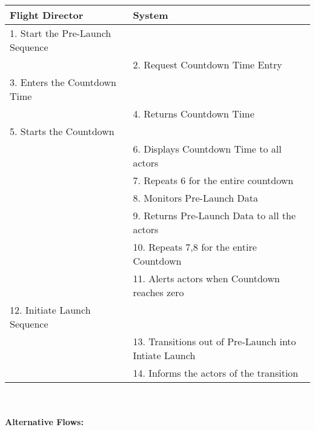 \documentclass[letterpaper]{article}
\begin{document}
\begin{tabular}{|p{5.75cm}|p{5.75cm}|}\hline
\textbf{Flight Director} & \textbf{System}\\\hline
1.  Start the Pre-Launch Sequence & \\\hline
& 2. Request Countdown Time Entry\\\hline
3.  Enters the Countdown Time & \\\hline
& 4.  Returns Countdown Time\\\hline
5.  Starts the Countdown  & \\\hline
& 6.  Displays Countdown Time to all actors\\\hline
& 7.  Repeats 6 for the entire countdown\\\hline
& 8.  Monitors Pre-Launch Data\\\hline
& 9. Returns Pre-Launch Data to all the actors\\\hline
& 10.  Repeats 7,8 for the entire Countdown\\\hline
& 11.  Alerts actors when Countdown reaches zero\\\hline
12.  Initiate Launch Sequence & \\\hline
& 13.  Transitions out of Pre-Launch into Intiate Launch\\\hline
& 14.  Informs the actors of the transition\\\hline
\end{tabular}\\\\
\textbf{Alternative Flows:  }
\end{document}
